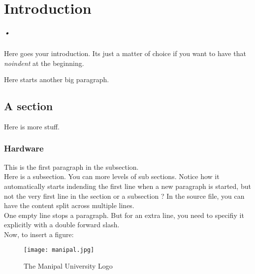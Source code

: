 

\chapter{Introduction}
\label{report}
\paragraph*{•}

\hspace{8mm} 

\noindent Here goes your introduction. Its just a matter of choice if you want to have
that \textit{noindent} at the beginning.

Here starts another big paragraph.

\section{A section}

Here is more stuff.
\subsection {Hardware}

This is the first paragraph in the subsection. \\

Here is a subsection. You can more levels of sub sections. Notice how it
automatically starts indending the first line when a new paragraph is started,
but not the very first line in the section or a subsection ?
In the source file, you can have the content split across multiple lines. \\

\noindent One empty line stops a paragraph. But for an extra line,
you need to specifiy it explicitly with a double forward slash.\\

\noindent Now, to insert a figure:

\begin{figure}[h]
  \centering
    \centering
    \texttt{[image: manipal.jpg]}
    \caption{The Manipal University Logo}
    \label{fig:manipal_logo}
\end{figure}



  
  

